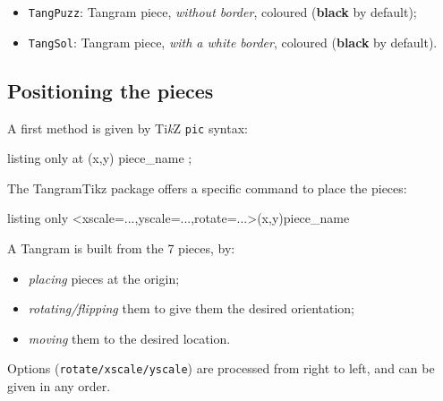 \documentclass{article}
\providecommand\tikzlogo{Ti\textit{k}Z}
\newcommand\Cle[1]{{\bfseries\sffamily\textlangle #1\textrangle}}
\begin{document}
\begin{itemize}
	\item \texttt{TangPuzz}: Tangram piece, \textit{without border}, coloured (\Cle{black} by default);
	\item \texttt{TangSol}: Tangram piece, \textit{with a white border}, coloured (\Cle{black} by default).
\end{itemize}

\pagebreak

\subsection{Positioning the pieces}

A first method is given by \tikzlogo{} \texttt{pic} syntax:

\begin{PresentationCode}{listing only}
\pic[style,rotate=...,xscale=...,yscale=...] at (x,y) {piece_name} ;
\end{PresentationCode}

The \textsf{TangramTikz} package offers a specific command to place the pieces:

\begin{PresentationCode}{listing only}
\PieceTangram[style={color}]<xscale=...,yscale=...,rotate=...>(x,y){piece_name}
\end{PresentationCode}

A Tangram is built from the 7 pieces, by:

\begin{itemize}
	\item \textit{placing} pieces at the origin;
	\item \textit{rotating/flipping} them to give them the desired orientation;
	\item \textit{moving} them to the desired location.
\end{itemize}

Options (\texttt{rotate/xscale/yscale}) are processed from right to left, and can be given in any order.
\end{document}
